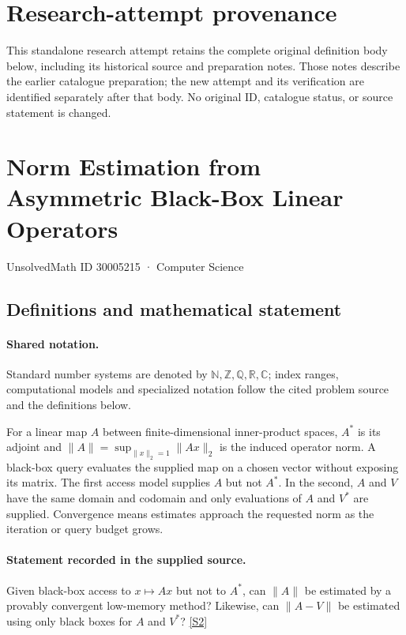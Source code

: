 \documentclass[11pt]{article}
\begin{document}
\section*{Research-attempt provenance}
This standalone research attempt retains the complete original definition body below,
including its historical source and preparation notes. Those notes describe the
earlier catalogue preparation; the new attempt and its verification are identified
separately after that body. No original ID, catalogue status, or source statement is changed.

\section{Norm Estimation from Asymmetric Black-Box Linear Operators}\label{30005215}
{\small UnsolvedMath ID 30005215 · Computer Science}
\subsection{Definitions and mathematical statement}

\paragraph{Shared notation.}Standard number systems are denoted by $\mathbb N,\mathbb Z,\mathbb Q,\mathbb R,\mathbb C$; index ranges, computational models and specialized notation follow the cited problem source and the definitions below.


For a linear map $A$ between finite-dimensional inner-product spaces, $A^*$ is its adjoint and $\lVert A\rVert=\sup_{\lVert x\rVert_2=1}\lVert Ax\rVert_2$ is the induced operator norm. A black-box query evaluates the supplied map on a chosen vector without exposing its matrix. The first access model supplies $A$ but not $A^*$. In the second, $A$ and $V$ have the same domain and codomain and only evaluations of $A$ and $V^*$ are supplied. Convergence means estimates approach the requested norm as the iteration or query budget grows.
\paragraph{Statement recorded in the supplied source.}
Given black-box access to $x\mapsto Ax$ but not to $A^*$, can $\lVert A\rVert$ be estimated by a provably convergent low-memory method? Likewise, can $\lVert A-V\rVert$ be estimated using only black boxes for $A$ and $V^*$? \href{https://doi.org/10.4171/owr/2022/38}{[S2]}
\end{document}
